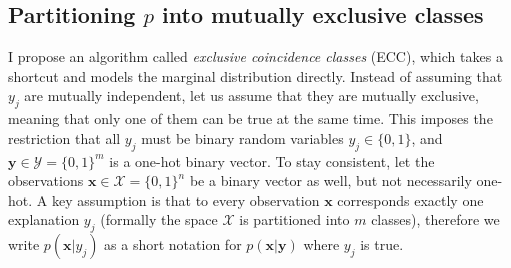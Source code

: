 \documentclass[12pt]{article}
\begin{document}
\subsection{Partitioning $p$ into mutually exclusive classes}

I  propose an algorithm called \textit{exclusive coincidence classes} (ECC), which takes a shortcut and models the marginal distribution directly.
Instead of assuming that $y_j$ are mutually independent, let us assume that they are mutually exclusive, meaning that only one of them can be true at the same time. This imposes the restriction that all $y_j$ must be binary random variables $y_j\in\{0,1\}$, and $\boldsymbol{y} \in \mathcal{Y} = \{0,1\}^m$ is a one-hot binary vector. To stay consistent, let the observations $\boldsymbol{x}\in \mathcal{X} = \{0,1\}^n$ be a binary vector as well, but not necessarily one-hot. A key assumption is that to every observation $\boldsymbol{x}$ corresponds exactly one explanation $y_j$ (formally the space $\mathcal{X}$ is partitioned into $m$ classes), therefore we write $p(\boldsymbol{x}|y_j)$ as a short notation for $p(\boldsymbol{x}|\boldsymbol{y})$ where $y_j$ is true.
\end{document}
